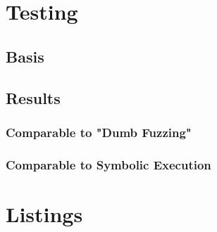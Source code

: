 \documentclass[a4paper]{article}
\begin{document}
\section{Testing}
\subsection{Basis}
\subsection{Results}
\subsubsection*{Comparable to "Dumb Fuzzing"}
\subsubsection*{Comparable to Symbolic Execution}







\section{Listings}
\begin{comment}
\begin{lstlisting}[caption=A program that is difficult to fuzz, label=diffToFuzz, captionpos=b]
int main(void)
{
    int x;
    read(0, &x, sizeof(x));
    
    if (x == 0x012345678)
        vulnerability();
}
\end{lstlisting}
\end{comment}
\end{document}
